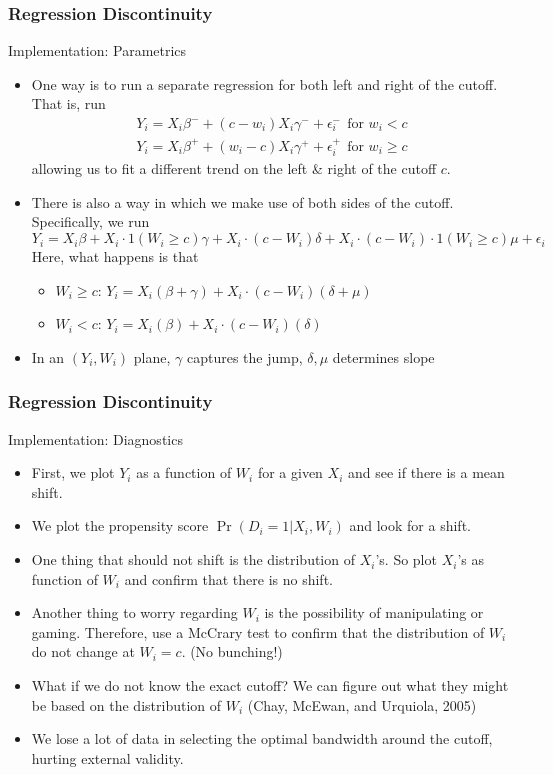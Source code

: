 \documentclass{beamer}
\begin{document}
\begin{frame}
\frametitle{Regression Discontinuity}
Implementation: Parametrics
\begin{itemize}
\item One way is to run a separate regression for both left and right of the cutoff. That is, run
\footnotesize{\begin{gather*}
Y_i = X_i\beta^- +(c-w_i)X_i\gamma^-+\epsilon_i^-\ \ \text{for }w_i<c\\
Y_i = X_i\beta^+ +(w_i-c)X_i\gamma^++\epsilon_i^+\ \ \text{for }w_i\geq c
\end{gather*}}\normalsize
allowing us to fit a different trend on the left \& right of the cutoff $c$. 
\item There is also a way in which we make use of both sides of the cutoff. Specifically, we run
\[
Y_i = X_i\beta+ X_i \cdot 1(W_i\geq c)\gamma+X_i\cdot(c-W_i)\delta+X_i\cdot (c-W_i)\cdot 1(W_i\geq c) \mu +\epsilon_i
\]
Here, what happens is that
\begin{itemize}
\item $W_i\geq c$: $Y_i=X_i(\beta+\gamma)+X_i\cdot(c-W_i)(\delta+\mu)$
\item $W_i< c$: $Y_i=X_i(\beta)+X_i\cdot(c-W_i)(\delta)$
\end{itemize}
\item In an $(Y_i, W_i)$ plane, $\gamma$ captures the jump, $\delta, \mu$ determines slope
\end{itemize}
\end{frame}

\begin{frame}
\frametitle{Regression Discontinuity}
Implementation: Diagnostics
\begin{itemize}
\item First, we plot $Y_i$ as a function of $W_i$ for a given $X_i$ and see if there is a mean shift. 
\item We plot the propensity score $\Pr(D_i=1|X_i, W_i)$ and look for a shift.
\item One thing that should not shift is the distribution of $X_i$'s. So plot $X_i$'s as function of $W_i$ and confirm that there is no shift. 
\item Another thing to worry regarding $W_i$ is the possibility of manipulating or gaming. Therefore, use a McCrary test to confirm that the distribution of $W_i$ do not change at $W_i=c$.  (No bunching!)
\item What if we do not know the exact cutoff? We can figure out what they might be based on the distribution of $W_i$ (Chay, McEwan, and Urquiola, 2005)
\item We lose a lot of data in selecting the optimal bandwidth around the cutoff, hurting external validity.
\end{itemize}
\end{frame}
\end{document}
